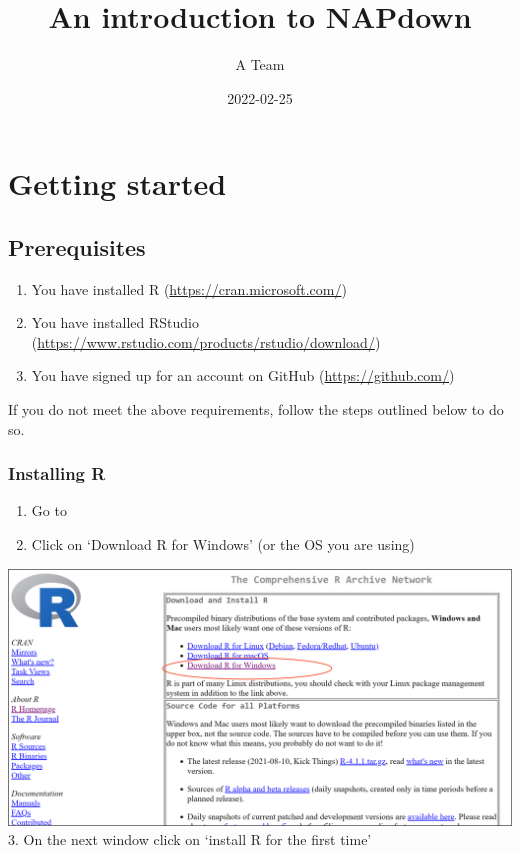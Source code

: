 \documentclass[
]{book}
\title{An introduction to NAPdown}
\author{A Team}
\date{2022-02-25}
\providecommand{\tightlist}{%
  \setlength{\itemsep}{0pt}\setlength{\parskip}{0pt}}
\begin{document}
\maketitle

{
\setcounter{tocdepth}{1}
\tableofcontents
}
\hypertarget{getting-started}{%
\chapter{Getting started}\label{getting-started}}

\hypertarget{prerequisites}{%
\section{Prerequisites}\label{prerequisites}}

\begin{enumerate}
\def\labelenumi{\arabic{enumi}.}
\tightlist
\item
  You have installed R (\url{https://cran.microsoft.com/})
\item
  You have installed RStudio (\url{https://www.rstudio.com/products/rstudio/download/})
\item
  You have signed up for an account on GitHub (\url{https://github.com/})
\end{enumerate}

If you do not meet the above requirements, follow the steps outlined below to do so.

\hypertarget{installing-r}{%
\subsection{Installing R}\label{installing-r}}

\begin{enumerate}
\def\labelenumi{\arabic{enumi}.}
\item
  Go to\href{https://cran.microsoft.com/}{}
\item
  Click on `Download R for Windows' (or the OS you are using)
\end{enumerate}

\includegraphics{tutorial_screenshots/download_r.png}\\
3. On the next window click on `install R for the first time'
\end{document}
